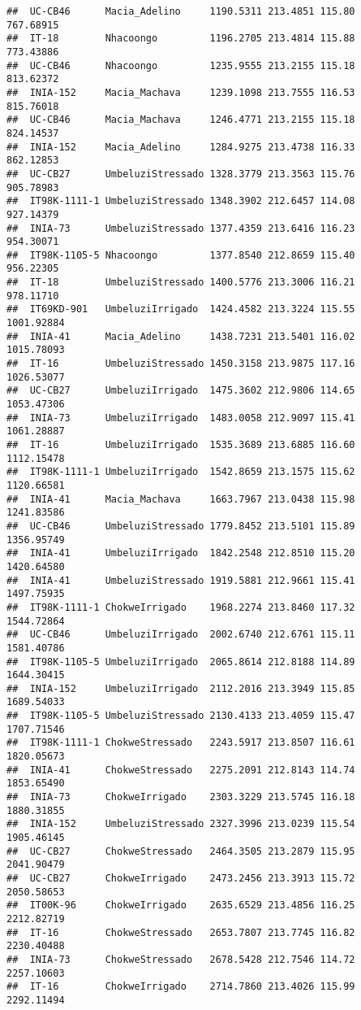 \documentclass[]{book}
\theoremstyle{definition}
\theoremstyle{definition}
\theoremstyle{definition}
\theoremstyle{remark}
\begin{document}
\begin{verbatim}
##  UC-CB46      Macia_Adelino     1190.5311 213.4851 115.80  767.68915
##  IT-18        Nhacoongo         1196.2705 213.4814 115.88  773.43886
##  UC-CB46      Nhacoongo         1235.9555 213.2155 115.18  813.62372
##  INIA-152     Macia_Machava     1239.1098 213.7555 116.53  815.76018
##  UC-CB46      Macia_Machava     1246.4771 213.2155 115.18  824.14537
##  INIA-152     Macia_Adelino     1284.9275 213.4738 116.33  862.12853
##  UC-CB27      UmbeluziStressado 1328.3779 213.3563 115.76  905.78983
##  IT98K-1111-1 UmbeluziStressado 1348.3902 212.6457 114.08  927.14379
##  INIA-73      UmbeluziStressado 1377.4359 213.6416 116.23  954.30071
##  IT98K-1105-5 Nhacoongo         1377.8540 212.8659 115.40  956.22305
##  IT-18        UmbeluziStressado 1400.5776 213.3006 116.21  978.11710
##  IT69KD-901   UmbeluziIrrigado  1424.4582 213.3224 115.55 1001.92884
##  INIA-41      Macia_Adelino     1438.7231 213.5401 116.02 1015.78093
##  IT-16        UmbeluziStressado 1450.3158 213.9875 117.16 1026.53077
##  UC-CB27      UmbeluziIrrigado  1475.3602 212.9806 114.65 1053.47306
##  INIA-73      UmbeluziIrrigado  1483.0058 212.9097 115.41 1061.28887
##  IT-16        UmbeluziIrrigado  1535.3689 213.6885 116.60 1112.15478
##  IT98K-1111-1 UmbeluziIrrigado  1542.8659 213.1575 115.62 1120.66581
##  INIA-41      Macia_Machava     1663.7967 213.0438 115.98 1241.83586
##  UC-CB46      UmbeluziStressado 1779.8452 213.5101 115.89 1356.95749
##  INIA-41      UmbeluziIrrigado  1842.2548 212.8510 115.20 1420.64580
##  INIA-41      UmbeluziStressado 1919.5881 212.9661 115.41 1497.75935
##  IT98K-1111-1 ChokweIrrigado    1968.2274 213.8460 117.32 1544.72864
##  UC-CB46      UmbeluziIrrigado  2002.6740 212.6761 115.11 1581.40786
##  IT98K-1105-5 UmbeluziIrrigado  2065.8614 212.8188 114.89 1644.30415
##  INIA-152     UmbeluziIrrigado  2112.2016 213.3949 115.85 1689.54033
##  IT98K-1105-5 UmbeluziStressado 2130.4133 213.4059 115.47 1707.71546
##  IT98K-1111-1 ChokweStressado   2243.5917 213.8507 116.61 1820.05673
##  INIA-41      ChokweStressado   2275.2091 212.8143 114.74 1853.65490
##  INIA-73      ChokweIrrigado    2303.3229 213.5745 116.18 1880.31855
##  INIA-152     UmbeluziStressado 2327.3996 213.0239 115.54 1905.46145
##  UC-CB27      ChokweStressado   2464.3505 213.2879 115.95 2041.90479
##  UC-CB27      ChokweIrrigado    2473.2456 213.3913 115.72 2050.58653
##  IT00K-96     ChokweIrrigado    2635.6529 213.4856 116.25 2212.82719
##  IT-16        ChokweStressado   2653.7807 213.7745 116.82 2230.40488
##  INIA-73      ChokweStressado   2678.5428 212.7546 114.72 2257.10603
##  IT-16        ChokweIrrigado    2714.7860 213.4026 115.99 2292.11494

\end{verbatim}
\end{document}

